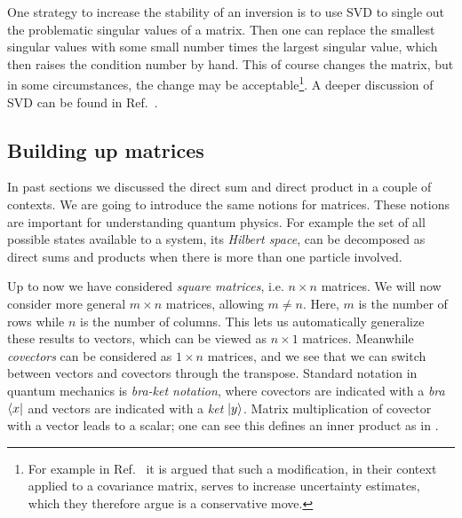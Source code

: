 One strategy to increase the stability of an inversion is to use
SVD to single out the problematic singular values of a matrix.
Then one can replace the smallest singular values with some small
number times the largest singular value, which then raises
the condition number by hand. This of course changes the matrix,
but in some circumstances, the change may be 
acceptable\footnote{For example in Ref.~\cite{dowdall_neutral_2019}
it is argued that such a modification, in their context applied
to a covariance matrix, serves to increase uncertainty estimates, which
they therefore argue is a conservative move.}.
A deeper discussion of SVD can be found in Ref.~\cite{press_numerical_2007}.


\subsection{Building up matrices}\label{sec:buildingMatrices}

In past sections we discussed the direct sum and direct product
in a couple of contexts. We are going to introduce the same notions
for matrices. These notions are important for understanding quantum
physics. For example the set of all possible states available
to a system, its {\it Hilbert space}, can
be decomposed as direct sums and products when there is more
than one particle involved.


Up to now we have considered {\it square matrices},
i.e. $n\times n$ matrices. We will now consider more general
$m\times n$ matrices, allowing $m\neq n$. Here, $m$ is the number
of rows while $n$ is the number of columns. This lets us automatically
generalize these results to vectors, which can be viewed as
$n\times 1$ matrices. Meanwhile {\it covectors}
can be considered as $1\times n$ matrices, and we see that we can switch
between vectors and covectors through the transpose. Standard notation
in quantum mechanics is {\it bra-ket notation},
where covectors are indicated with a {\it bra} $\bra{x}$ and
vectors are indicated with a {\it ket} $\ket{y}$.
Matrix multiplication of covector with a vector leads to a scalar;
one can see this defines an inner product as in .

